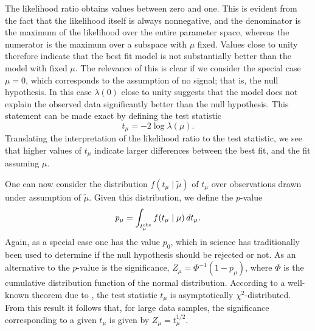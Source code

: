 The likelihood ratio obtains values between zero and one. This is evident from the fact that the likelihood itself is always nonnegative, and the denominator is the maximum of the likelihood over the entire parameter space, whereas the numerator is the maximum over a subspace with $\mu$ fixed. Values close to unity therefore indicate that the best fit model is not substantially better than the model with fixed $\mu$. The relevance of this is clear if we consider the special case $\mu=0$, which corresponds to the assumption of no signal; that is, the null hypothesis. In this case $\lambda(0)$ close to unity suggests that the model does not explain the observed data significantly better than the null hypothesis. This statement can be made exact by defining the test statistic
\begin{equation}
    t_\mu=-2\log\lambda(\mu).
\end{equation}
Translating the interpretation of the likelihood ratio to the test statistic, we see that higher values of $t_\mu$ indicate larger differences between the best fit, and the fit assuming $\mu$.

One can now consider the distribution $f(t_\mu\mid\tilde{\mu})$ of $t_\mu$ over observations drawn under assumption of $\tilde{\mu}$. Given this distribution, we define the $p$-value
\begin{equation}
    p_\mu=\int_{t_\mu^\text{obs}}f(t_\mu\mid\mu)\,d t_\mu.
\end{equation}
Again, as a special case one has the value $p_0$, which in science has traditionally been used to determine if the null hypothesis should be rejected or not. As an alternative to the $p$-value is the significance, $Z_\mu=\Phi^{-1}(1-p_\mu)$, where $\Phi$ is the cumulative distribution function of the normal distribution. According to a well-known theorem due to \textcite{Wilks1938}, the test statistic $t_\mu$ is asymptotically $\chi^2$-distributed. From this result it follows that, for large data samples, the significance corresponding to a given $t_\mu$ is given by $Z_\mu=t_\mu^{1/2}$.

